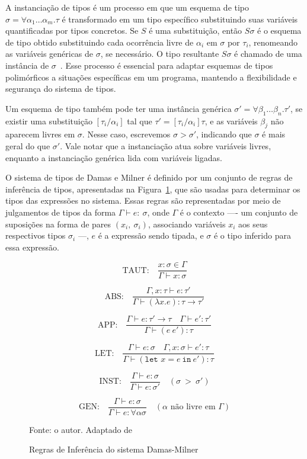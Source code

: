 A instanciação de tipos é um processo em que um esquema de tipo $\sigma = \forall \alpha_1 \ldots \alpha_m. \tau$ é transformado em um tipo específico substituindo suas variáveis quantificadas por tipos concretos.
Se $S$ é uma substituição, então $S\sigma$ é o esquema de tipo obtido substituindo cada ocorrência livre de $\alpha_i$ em $\sigma$ por $\tau_i$, renomeando as variáveis genéricas de $\sigma$, se necessário.
O tipo resultante $S\sigma$ é chamado de uma instância de $\sigma$~\cite{damas1982principal}.
Esse processo é essencial para adaptar esquemas de tipos polimórficos a situações específicas em um programa, mantendo a flexibilidade e segurança do sistema de tipos.

Um esquema de tipo também pode ter uma instância genérica $\sigma' = \forall \beta_1 \ldots \beta_n. \tau'$, se existir uma substituição $[ \tau_i / \alpha_i ]$ tal que $\tau' = [\tau_i / \alpha_i]\tau$, e as variáveis $\beta_j$ não aparecem livres em $\sigma$.
Nesse caso, escrevemos $\sigma > \sigma'$, indicando que $\sigma$ é mais geral do que $\sigma'$.
Vale notar que a instanciação atua sobre variáveis livres, enquanto a instanciação genérica lida com variáveis ligadas.

O sistema de tipos de Damas e Milner é definido por um conjunto de regras de inferência de tipos, apresentadas na Figura~\ref{eq:type-inference}, que são usadas para determinar os tipos das expressões no sistema.
Essas regras são representadas por meio de julgamentos de tipos da forma $\Gamma \vdash e{:}\ \sigma$, onde $\Gamma$ é o contexto —- um conjunto de suposições na forma de pares $(x_i,\ \sigma_i)$, associando variáveis $x_i$ aos seus respectivos tipos $\sigma_i$ —, $e$ é a expressão sendo tipada, e $\sigma$ é o tipo inferido para essa expressão.

\begin{figure}[ht!]
  \centering
  \[
    \text{TAUT:} \quad \frac{x : \sigma \in \Gamma}{\Gamma \vdash x : \sigma}
  \]

  \[
    \text{ABS:} \quad \frac{\Gamma, x : \tau \vdash e : \tau'}{\Gamma \vdash (\lambda x. e) : \tau \to \tau'}
  \]

  \[
    \text{APP:} \quad \frac{\Gamma \vdash e : \tau' \to \tau \quad \Gamma \vdash e' : \tau'}{\Gamma \vdash (e \ e') : \tau}
  \]

  \[
    \text{LET:} \quad \frac{\Gamma \vdash e : \sigma \quad \Gamma, x : \sigma \vdash e' : \tau}{\Gamma \vdash (\texttt{let } x = e \ \texttt{in} \ e') : \tau}
  \]

  \[
    \text{INST:} \quad \frac{\Gamma \vdash e : \sigma}{\Gamma \vdash e : \sigma'} \quad \scriptstyle (\sigma\ >\ \sigma')
  \]

  \[
    \text{GEN:} \quad \frac{\Gamma \vdash e : \sigma}{\Gamma \vdash e : \forall \alpha \sigma} \quad \scriptstyle (\alpha \text{ não livre em } \Gamma)
  \]

  \caption{Regras de Inferência do sistema Damas-Milner}
  \small{Fonte: o autor. Adaptado de~\cite{damas1982principal}}\label{eq:type-inference}
\end{figure}

